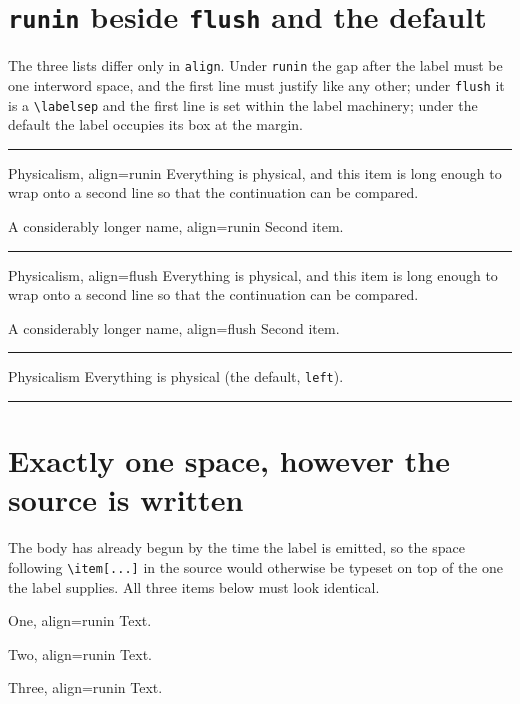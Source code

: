 \documentclass{article}
\begin{document}
\section{\texttt{runin} beside \texttt{flush} and the default}

The three lists differ only in \texttt{align}.  Under \verb|runin| the gap
after the label must be one interword space, and the first line must justify
like any other; under \verb|flush| it is a \verb|\labelsep| and the first line
is set within the label machinery; under the default the label occupies its
box at the margin.

\noindent\rule{\textwidth}{0.3pt}
\begin{prop}
  \item[Physicalism, align=runin] Everything is physical, and this item is long
  enough to wrap onto a second line so that the continuation can be compared.
  \item[A considerably longer name, align=runin] Second item.
\end{prop}
\noindent\rule{\textwidth}{0.3pt}
\begin{prop}
  \item[Physicalism, align=flush] Everything is physical, and this item is long
  enough to wrap onto a second line so that the continuation can be compared.
  \item[A considerably longer name, align=flush] Second item.
\end{prop}
\noindent\rule{\textwidth}{0.3pt}
\begin{prop}
  \item[Physicalism] Everything is physical (the default, \texttt{left}).
\end{prop}
\noindent\rule{\textwidth}{0.3pt}

\section{Exactly one space, however the source is written}

The body has already begun by the time the label is emitted, so the space
following \verb|\item[...]| in the source would otherwise be typeset on top of
the one the label supplies.  All three items below must look identical.

\begin{prop}
  \item[One, align=runin] Text.
  \item[Two, align=runin]      Text.
  \item[Three, align=runin]
  Text.
\end{prop}
\end{document}
